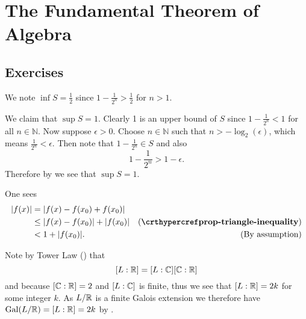 \section{The Fundamental Theorem of Algebra}
\subsection*{Exercises}
\begin{questions}
    \item We note $\inf S = \frac12$ since $1 - \frac1{2^n} >
    \frac12$ for $n > 1$.

    We claim that $\sup S = 1$. Clearly 1 is an upper bound of $S$ since $1 - \frac1{2^n} < 1$ for all $n \in \mathbb{N}$. Now suppose $\epsilon > 0$. Choose $n \in \mathbb{N}$ such that $n > -\log_2(\epsilon)$, which means $\frac1{2^n} < \epsilon$. Then note that $1 - \frac1{2^n} \in S$ and also
    \[
        1 - \frac1{2^n} > 1 - \epsilon.
    \]
    Therefore by  we see that $\sup S = 1$.

    \item One sees
    \begin{align*}
        |f(x)| &= |f(x) - f(x_0) + f(x_0)|\\
        &\leq |f(x) - f(x_0)| + |f(x_0)| & (\myref{prop-triangle-inequality})\\
        &< 1 + |f(x_0)|. & (\text{By assumption})
    \end{align*}

    \item Note by Tower Law () that
    \[
        [L:\mathbb{R}] = [L:\mathbb{C}][\mathbb{C}:\mathbb{R}]
    \]
    and because $[\mathbb{C}:\mathbb{R}] = 2$ and $[L:\mathbb{C}]$ is finite, thus we see that $[L:\mathbb{R}] = 2k$ for some integer $k$. As $L/\mathbb{R}$ is a finite Galois extension we therefore have $\mathrm{Gal}(L/\mathbb{R}) = [L:\mathbb{R}] = 2k$ by .


\end{questions}
